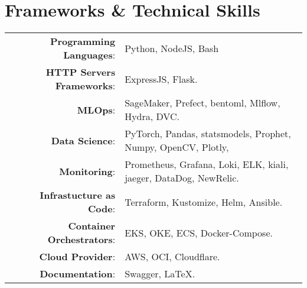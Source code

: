 \documentclass[a4paper,10pt]{article}
\begin{document}
\section{\textbf{Frameworks \& Technical Skills}}

\begin{longtable}{r p{16cm}}	
    \textbf{Programming Languages}:& Python, NodeJS, Bash\\
    \textbf{HTTP Servers Frameworks}:& ExpressJS, Flask.\\
    \textbf{MLOps}:& SageMaker, Prefect, bentoml, Mlflow, Hydra, DVC.\\
    \textbf{Data Science}:& PyTorch, Pandas, statsmodels, Prophet, Numpy, OpenCV, Plotly,\\
    \textbf{Monitoring}:& Prometheus, Grafana, Loki, ELK, kiali, jaeger, DataDog, NewRelic.\\ 
    \textbf{Infrastucture as Code}:& Terraform, Kustomize, Helm, Ansible.\\
    \textbf{Container Orchestrators}:& EKS, OKE, ECS, Docker-Compose. \\
    \textbf{Cloud Provider}:& AWS, OCI, Cloudflare. \\
    \textbf{Documentation}:& Swagger, \LaTeX.\\
\end{longtable}
\end{document}
